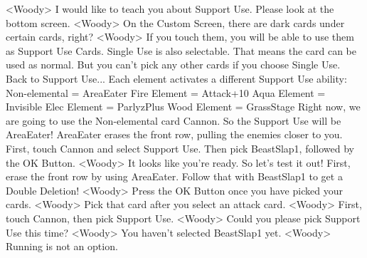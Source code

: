 <Woody> I would like to teach you about Support Use. Please look at the bottom screen. 
<Woody> On the Custom Screen, there are dark cards under certain cards, right? 
<Woody> If you touch them, you will be able to use them as Support Use Cards. 
Single Use is also selectable. That means the card can be used as normal. But you 
can't pick any other cards if you choose Single Use. 
Back to Support Use... Each element activates a different Support Use ability: 
Non-elemental = AreaEater Fire Element = Attack+10 Aqua Element = Invisible 
Elec Element = ParlyzPlus Wood Element = GrassStage 
Right now, we are going to use the Non-elemental card 
Cannon. So the Support Use will be AreaEater! 
AreaEater erases the 
front row, pulling the enemies closer to you. 
First, touch Cannon and select Support Use. Then 
pick BeastSlap1, followed by the OK Button. 
<Woody> It looks like you're ready. So let's test it out! 
First, erase the front row by using AreaEater. 
Follow that with BeastSlap1 to get a Double Deletion! 
<Woody> Press the OK Button once you have picked your cards. 
<Woody> Pick that card after you select an attack card. 
<Woody> First, touch Cannon, then pick Support Use. 
<Woody> Could you please pick Support Use this time? 
<Woody> You haven't selected BeastSlap1 yet. 
<Woody> Running is not an option. 
